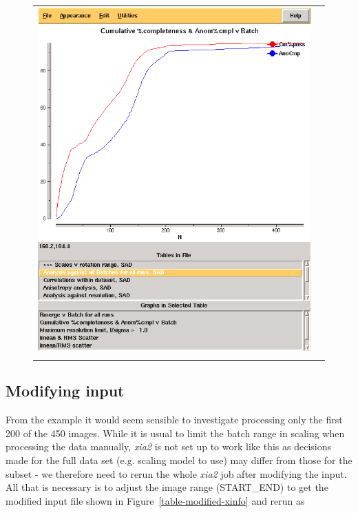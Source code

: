 \documentclass[a4paper, 11pt]{article}
\begin{document}
\begin{figure}
\begin{tabular}{cc}
  \includegraphics[scale=0.4, bb=0 0 1212 1524]{figures/3qrn-all-complete-aimless.png} \\
\fi
\end{tabular}
\end{figure}

\subsection{Modifying input}

From the example it would seem sensible to investigate processing only the
first 200 of the 450 images. While it is usual to limit the batch range in 
scaling when processing the data manually, \emph{xia2} is not set up to 
work like this as decisions made for the full data set (e.g. scaling model
to use) may differ from those for the subset - we therefore need to rerun the
whole \emph{xia2} job after modifying the input. All that is necessary is to 
adjust the image range (START\_END) to get the modified input file shown in 
Figure~\ref{table-modified-xinfo} and rerun as 
\end{document}
